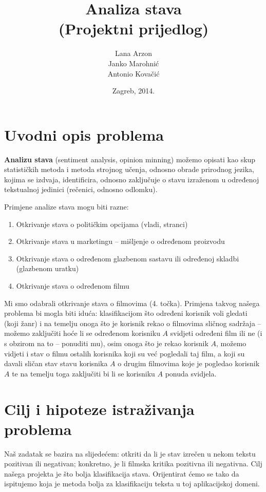 \documentclass[12pt,a4paper,titlepage]{article}
\title{Analiza stava\\(Projektni prijedlog)}
\author{Lana Arzon\\Janko Marohnić\\Antonio Kovačić}
\date{Zagreb, 2014.}
\begin{document}
\maketitle

\tableofcontents

\newpage

\section{Uvodni opis problema}

\textbf{Analizu stava} (sentiment analysis, opinion minning) možemo opisati kao skup statističkih metoda i metoda strojnog učenja, odnosno obrade prirodnog jezika, kojima se izdvaja, identificira, odnosno zaključuje o stavu izraženom u određenoj tekstualnoj jedinici (rečenici, odnosno odlomku).

Primjene analize stava mogu biti razne:

\begin{enumerate}
  \item Otkrivanje stava o političkim opcijama (vladi, stranci)
  \item Otkrivanje stava u marketingu -- mišljenje o određenom proizvodu
  \item Otkrivanje stava o određenom glazbenom sastavu ili određenoj skladbi (glazbenom uratku)
  \item Otkrivanje stava o određenom filmu
\end{enumerate}

Mi smo odabrali otkrivanje stava o filmovima (4. točka). Primjena takvog našega problema bi mogla biti iduća: klasifikacijom što određeni korisnik voli gledati (koji žanr) i na temelju onoga što je korisnik rekao o filmovima sličnog sadržaja -- možemo zaključiti hoće li se određenom korisniku $A$ svidjeti određeni film ili ne (i s obzirom na to -- ponuditi mu), osim onoga što je rekao korisnik $A$, možemo vidjeti i stav o filmu ostalih korisnika koji su već pogledali taj film, a koji su davali sličan stav stavu korisnika $A$ o drugim filmovima koje je pogledao korisnik $A$ te na temelju toga zaključiti bi li se korisniku $A$ ponuda svidjela.

\section{Cilj i hipoteze istraživanja problema}

Naš zadatak se bazira na slijedećem: otkriti da li je stav izrečen u nekom tekstu pozitivan ili negativan; konkretno, je li filmska kritika pozitivna ili negativna. Cilj našega projekta je što bolja klasifikacija stava. Orijentirat ćemo se tako da ispitujemo koja je metoda bolja za klasifikaciju teksta u toj aplikacijskoj domeni.
\end{document}
